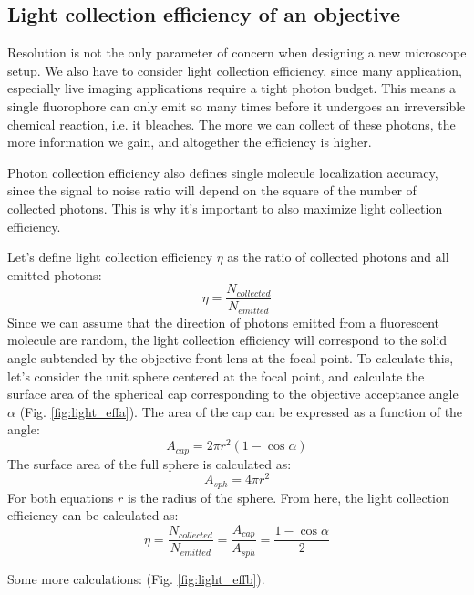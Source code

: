  \subsection{Light collection efficiency of an objective}
    Resolution is not the only parameter of concern when designing a new microscope setup. We also have to consider light collection efficiency, since many application, especially live imaging applications require a tight photon budget. This means a single fluorophore can only emit so many times before it undergoes an irreversible chemical reaction, i.e. it bleaches. The more we can collect of these photons, the more information we gain, and altogether the efficiency is higher.

    Photon collection efficiency also defines single molecule localization accuracy, since the signal to noise ratio will depend on the square of the number of collected photons. This is why it's important to also maximize light collection efficiency.

    Let's define light collection efficiency $\eta$ as the ratio of collected photons and all emitted photons:
    \[
    \eta = \frac{N_{collected}}{N_{emitted}}
    \]
    Since we can assume that the direction of photons emitted from a fluorescent molecule are random, the light collection efficiency will correspond to the solid angle subtended by the objective front lens at the focal point. To calculate this, let's consider the unit sphere centered at the focal point, and calculate the surface area of the spherical cap corresponding to the objective acceptance angle $\alpha$ (Fig. \ref{fig:light_effa}). The area of the cap can be expressed as a function of the angle:
    \[
    A_{cap} = 2\pi r^2 (1-\cos \alpha)
    \]
    The surface area of the full sphere is calculated as:
    \[
    A_{sph} = 4 \pi r^2
    \]
    For both equations $r$ is the radius of the sphere. From here, the light collection efficiency can be calculated as:
    \[
    \eta = \frac{N_{collected}}{N_{emitted}} = \frac{A_{cap}}{A_{sph}} = \frac{1-\cos \alpha}{2}
    \]

    Some more calculations: (Fig. \ref{fig:light_effb}).


